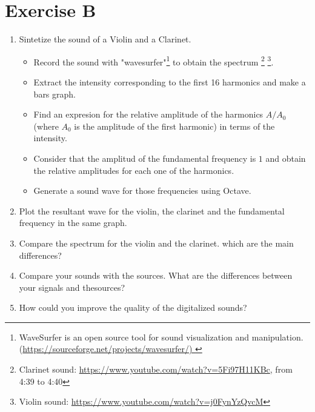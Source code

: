 \documentclass[12pt]{article}
\begin{document}
\newpage
\section*{Exercise B}

\begin{enumerate}
\item Sintetize the sound of a Violin and a Clarinet.

\begin{itemize}
\item  Record the sound with "wavesurfer"\footnote{ WaveSurfer is an open source tool for sound visualization and manipulation.  (\url{https://sourceforge.net/projects/wavesurfer/)
}}  to obtain the spectrum \footnote{Clarinet sound: \url{https://www.youtube.com/watch?v=5Fi97H11KBc}, from 4:39 to 4:40}
\footnote{Violin sound: \url{https://www.youtube.com/watch?v=j0FynYzQvcM}}. 
\vspace{3mm}

\item Extract the intensity corresponding to the first 16 harmonics and make a bars graph.
\vspace{3mm}

\item Find an expresion for the relative amplitude of the  harmonics $A/A_0$ (where $A_0$ is
the amplitude of the first harmonic) in terms of the intensity.

\item Consider that the amplitud of the fundamental frequency is $1$ and obtain the relative amplitudes for
each one of the harmonics.
 
\item Generate a sound wave for those frequencies using Octave.
\vspace{3mm}

\end{itemize}

\item Plot the resultant wave for the violin, the clarinet and the fundamental frequency in 
the same graph.

\vspace{3mm}
\item Compare the spectrum for the violin and the clarinet. which are the main differences?

\vspace{3mm}

\item Compare your sounds with the sources. What are the differences between your signals and thesources?

\vspace{3mm}

\item How could you improve the quality of the digitalized sounds?

\end{enumerate}




\end{document}
